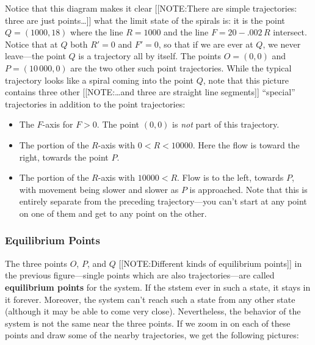 Notice that this diagram makes it clear 
[[NOTE:There are simple trajectories: three are just points\ldots]]
what the limit state of the spirals is: it is the point $Q=(1000,
18)$\label{eqpt} where the line $R=1000$ and the line $F=20-.002\,R$
intersect.  Notice that at $Q$ both $R'=0$ and $F'=0$, so that if we
are ever at $Q$, we never leave---the point $Q$ is a trajectory all by
itself.  The points $O = (0, 0)$ and $P = (10\,000, 0)$ are the two
other such point trajectories. While the typical trajectory looks like
a spiral coming into the point $Q$, note that this picture contains
three other 
[[NOTE:\ldots and three are straight line segments]] 
``special'' trajectories in addition to the point trajectories:
\begin{itemize}

\item The $F$-axis for $F>0$. The point $(0, 0)$ is {\em not\/} part
  of this trajectory.

\item The portion of the $R$-axis with $0 < R < 10000$.  Here the flow
  is toward the right, towards the point $P$.

\item The portion of the $R$-axis with $10000 < R$.  Flow is to the
  left, towards $P$, with movement being slower and slower as $P$ is
  approached.  Note that this is entirely separate from the preceding
  trajectory---you can't start at any point on one of them and get to
  any point on the other.

\end{itemize}

\subsubsection{Equilibrium Points}
\label{subsubsec:equilibrium-points}

\enlargethispage*{20pt}
The three points $O$, $P$, and $Q$ 
[[NOTE:Different kinds of  equilibrium points]]
in the previous figure---single points which are also
trajectories---are called {\bf equilibrium points} for the system.  If
the ststem ever in such a state, it stays in it forever.  Moreover,
the system can't reach such a state from any other state (although it
may be able to come very close).  Nevertheless, the behavior of the
system is not the same near the three points. If we zoom in on each of
these points and draw some of the nearby trajectories, we get the
following pictures:


